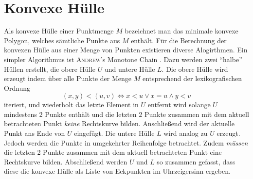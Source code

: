 \section*{Konvexe Hülle}

Als konvexe Hülle einer Punktmenge $M$ bezeichnet man das minimale konvexe Polygon, welches sämtliche Punkte aus $M$ enthält.
Für die Berechnung der konvexen Hülle aus einer Menge von Punkten existieren diverse Alogirthmen.
Ein simpler Algorithmus ist \textsc{Andrew}'s Monotone Chain \cite{compgeom2008}.
Dazu werden zwei "`halbe"' Hüllen erstellt, die obere Hülle $U$ und untere Hülle $L$.
Die obere Hülle wird erzeugt indem über alle Punkte der Menge $M$ entsprechend der lexikografischen Ordnung
  \[ (x,y) < (u, v) \Longleftrightarrow x < u \vee x = u \wedge y < v \]
iteriert, und wiederholt das letzte Element in $U$ entfernt wird solange $U$ mindestens 2 Punkte enthält und die letzten 2 Punkte zusammen mit dem aktuell betrachteten Punkt \emph{keine} Rechtskurve bilden.
Anschließend wird der aktuelle Punkt ans Ende von $U$ eingefügt.
Die untere Hülle $L$ wird analog zu $U$ erzeugt.
Jedoch werden die Punkte in umgekehrter Reihenfolge betrachtet.
Zudem \emph{müssen} die letzten 2 Punkte zusammen mit dem aktuell betrachteten Punkt eine Rechtskurve bilden. Abschließend werden $U$ und $L$ so zusammen gefasst, dass diese die konvexe Hülle als Liste von Eckpunkten im Uhrzeigersinn ergeben.
